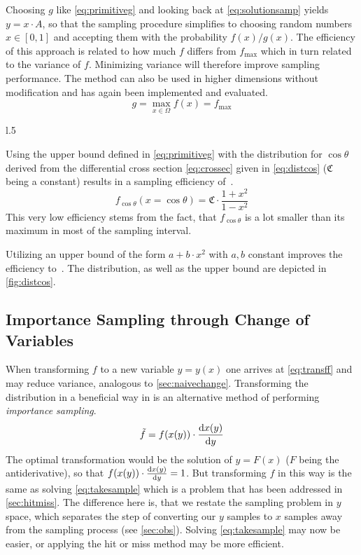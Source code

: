 Choosing \(g\) like \cref{eq:primitiveg} and looking back at
\cref{eq:solutionsamp} yields \(y = x\cdot A\), so that the sampling
procedure simplifies to choosing random numbers \(x\in [0,1]\) and
accepting them with the probability \(f(x)/g(x)\). The efficiency of
this approach is related to how much \(f\) differs from
\(f_{\text{max}}\) which in turn related to the variance of
\(f\). Minimizing variance will therefore improve sampling
performance. The method can also be used in higher dimensions without
modification and has again been implemented and evaluated.
%
\begin{equation}
  \label{eq:primitiveg}
  g=\max_{x\in\Omega}f(x)=f_{\text{max}}
\end{equation}
%
\begin{wrapfigure}[15]{l}{.5\textwidth}
  \caption{\label{fig:distcos} The distribution \cref{eq:distcos} and an upper bound of
    the form \(a + b\cdot x^2\).}
\end{wrapfigure}
%
Using the upper bound defined in \cref{eq:primitiveg} with the
distribution for \(\cos\theta\) derived from the differential cross
section \cref{eq:crossec} given in \cref{eq:distcos}
(\(\mathfrak{C}\) being a constant) results in a sampling efficiency
of~.
%
\begin{equation}
  \label{eq:distcos}
  f_{\cos\theta}(x=\cos\theta) = \mathfrak{C}\cdot\frac{1+x^2}{1-x^2}
\end{equation}
%
This very low efficiency stems from the fact, that \(f_{\cos\theta}\)
is a lot smaller than its maximum in most of the sampling interval.

Utilizing an upper bound of the form \(a + b\cdot x^2\) with \(a, b\)
constant improves the efficiency
to~. The distribution, as well as the
upper bound are depicted in \cref{fig:distcos}.

\subsection{Importance Sampling through Change of Variables}%
\label{sec:importsamp}

When transforming \(f\) to a new variable \(y=y(x)\) one arrives at
\cref{eq:transff} and may reduce variance, analogous to
\cref{sec:naivechange}. Transforming the distribution in a beneficial
way in is an alternative method of performing \emph{importance
  sampling}.
%
\begin{equation}
  \label{eq:transff}
  \tilde{f} = f(x(y)) \cdot \dv{x(y)}{y}
\end{equation}
%
The optimal transformation would be the solution of \(y = F(x)\)
(\(F\) being the antiderivative), so that
\(f(x(y)) \cdot \dv{x(y)}{y} = 1\). But transforming \(f\) in this way
is the same as solving \cref{eq:takesample} which is a problem that
has been addressed in \cref{sec:hitmiss}. The difference here is, that
we restate the sampling problem in \(y\) space, which separates the
step of converting our \(y\) samples to \(x\) samples away from the
sampling process (see \cref{sec:obs}). Solving \cref{eq:takesample}
may now be easier, or applying the hit or miss method may be more
efficient.


